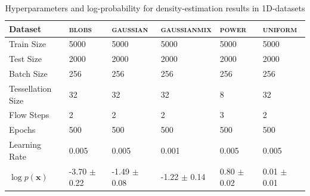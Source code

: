 \begin{table}[!htb]
  \small
  \caption{Hyperparameters and log-probability for density-estimation results in 1D-datasets}
  \label{tab:nf_1d}
  \begin{center}
  \begin{tabular}{llllll}
    \toprule
    Dataset & \textsc{blobs} & \textsc{gaussian} & \textsc{gaussianmix} & \textsc{power} & \textsc{uniform} \\
    \midrule
    Train Size           &              5000 &              5000 &              5000 &             5000 &             5000 \\
    Test Size            &              2000 &              2000 &              2000 &             2000 &             2000 \\
    Batch Size           &               256 &               256 &               256 &              256 &              256 \\
    Tessellation Size    &                32 &                32 &                32 &                8 &               32 \\
    Flow Steps           &                 2 &                 2 &                 2 &                3 &                2 \\
    Epochs               &               500 &               500 &               500 &              500 &              500 \\
    Learning Rate        &             0.005 &             0.005 &             0.001 &            0.005 &            0.005 \\ \midrule
    $\log p(\mathbf{x})$ &  -3.70 $\pm$ 0.22 &  -1.49 $\pm$ 0.08 &  -1.22 $\pm$ 0.14 &  0.80 $\pm$ 0.02 &  0.01 $\pm$ 0.01 \\
    \bottomrule
    \end{tabular}    
  \end{center}
\end{table}

